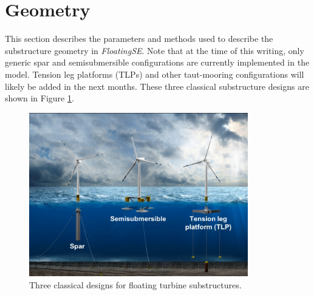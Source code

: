 \section{Geometry}
\label{sec:geom}
This section describes the parameters and methods used to describe the
substructure geometry in \textit{FloatingSE}.  Note that at the time of this
writing, only generic spar and semisubmersible configurations are
currently implemented in the model.  Tension leg platforms (TLPs) and
other taut-mooring configurations will likely be added in the next
months.  These three classical substructure designs are shown in Figure
\ref{fig:archetype}.
\begin{figure}
  \begin{center}
    \includegraphics[width=3.75in]{figs/archetypes}
    \caption{Three classical designs for floating turbine substructures.}
    \label{fig:archetype}
  \end{center}
\end{figure}

